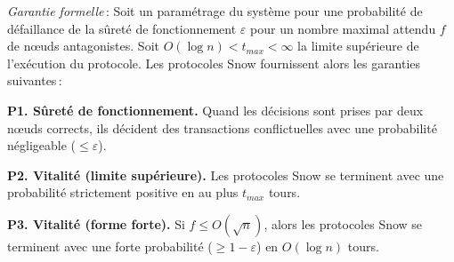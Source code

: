 \documentclass[letterpaper,twocolumn,10pt]{article}
\newcommand{\Oh}[1]{O(#1)}
\theoremstyle{definition}
\begin{document}
\emph{Garantie formelle}\,: Soit un paramétrage du système pour une probabilité de défaillance de la sûreté de fonctionnement $\varepsilon$ pour un nombre maximal attendu $f$ de nœuds antagonistes. Soit $\Oh{\log n} < t_{max} < \infty$ la limite supérieure de l'exécution du protocole. Les protocoles Snow fournissent alors les garanties suivantes\,:
\begin{compactitem}

     \item \textbf{P1. Sûreté de fonctionnement.} Quand les décisions sont prises par deux nœuds corrects, ils décident des transactions conflictuelles avec une probabilité négligeable ($\leq \varepsilon$).
     \item \textbf{P2. Vitalité (limite supérieure).} Les protocoles Snow se terminent avec une probabilité strictement positive en au plus $t_{max}$ tours.
     \item \textbf{P3. Vitalité (forme forte).} Si $f \leq \Oh{\sqrt{n}}$, alors les protocoles Snow se terminent avec une forte probabilité ($\geq 1 - \varepsilon$) en $\Oh{\log{n}}$ tours.
\end{compactitem}
\end{document}
